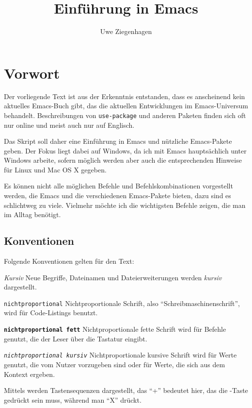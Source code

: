 \documentclass[12pt,ngerman]{scrbook}
\title{Einführung in Emacs}
\author{Uwe Ziegenhagen}
\begin{document}
\maketitle

\frontmatter

\tableofcontents


\chapter*{Vorwort}

Der vorliegende Text ist aus der Erkenntnis entstanden, dass es anscheinend kein aktuelles Emacs-Buch gibt, das die aktuellen Entwicklungen im Emacs-Universum behandelt. 
Beschreibungen von \texttt{use-package} und anderen Paketen finden sich oft nur online und meist auch nur auf Englisch. 

Das Skript soll daher eine Einführung in Emacs und nützliche Emacs-Pakete geben. 
Der Fokus liegt dabei auf Windows, da ich mit Emacs hauptsächlich unter Windows arbeite,  sofern möglich werden aber auch die entsprechenden Hinweise für Linux und Mac OS X gegeben. 

Es können nicht alle möglichen Befehle und Befehlskombinationen vorgestellt werden, die Emacs und die verschiedenen Emacs-Pakete bieten, dazu sind es schlichtweg zu viele. Vielmehr möchte ich die wichtigsten Befehle zeigen, die man im Alltag benötigt.

\section*{Konventionen}

Folgende Konventionen gelten für den Text:

\textit{Kursiv} Neue Begriffe, Dateinamen und Dateierweiterungen werden \textit{kursiv} dargestellt.

\texttt{nichtproportional} Nichtproportionale Schrift, also \enquote{Schreibmaschinenschrift}, wird für Code-Listings benutzt.

\texttt{\bfseries nichtproportional fett} Nichtproportionale fette Schrift wird für Befehle genutzt, die der Leser über die Tastatur eingibt.

\texttt{\textit{nichtproportional kursiv}} Nichtproportionale kursive Schrift wird für Werte genutzt, die vom Nutzer vorzugeben sind oder für Werte, die sich aus dem Kontext ergeben.

Mittels   werden Tastensequenzen dargestellt, das \enquote{+} bedeutet hier, das die \LKeyStrg-Taste gedrückt sein muss, während man \enquote{X} drückt.
\end{document}
